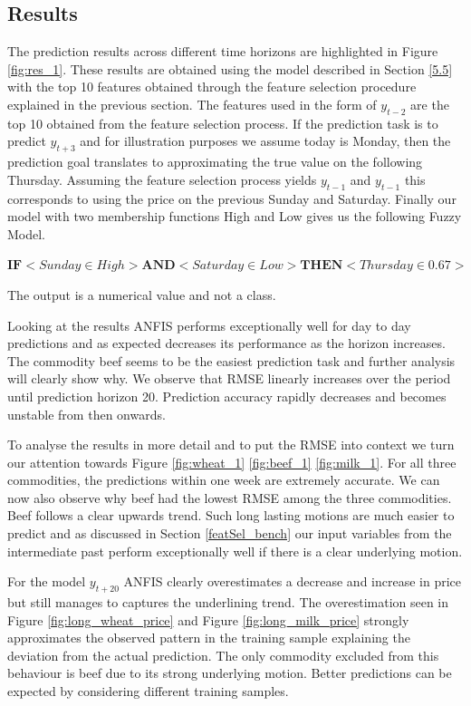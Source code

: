 \subsection{Results}

The prediction results across different time horizons are highlighted in Figure \ref{fig:res_1}. These results are obtained using the model described in Section \ref{5.5} with the top 10 features obtained through the feature selection procedure explained in the previous section. The features used in the form of $y_{t-2}$ are the top 10 obtained from the feature selection process. If the prediction task is to predict $y_{t+3}$ and for illustration purposes we assume today is Monday, then the prediction goal translates to approximating the true value on the following Thursday. Assuming the feature selection process yields $y_{t-1}$  and $y_{t-1}$ this corresponds to using the price on the previous Sunday and Saturday. Finally our model with two membership functions High and Low gives us the following Fuzzy Model. \\


\centerline {$ \textbf{IF} <  Sunday \in High> \textbf{AND} < Saturday \in Low > \textbf{THEN} <  Thursday \in 0.67 > $} 

The output is a numerical value and not a class. 

 Looking at the results ANFIS performs exceptionally well for day to day predictions and as expected decreases its performance as the horizon increases. The commodity beef seems to be the easiest prediction task and further analysis will clearly show why.   We observe that RMSE linearly increases over the period until prediction horizon 20. Prediction accuracy rapidly decreases and becomes unstable from then onwards.  

To analyse the results in more detail and to put the RMSE into context  we turn our attention towards Figure \ref{fig:wheat_1} \ref{fig:beef_1} \ref{fig:milk_1}. For all three commodities, the predictions within one week are extremely accurate. We can now also observe why beef had the lowest RMSE among the three commodities. Beef follows a clear upwards trend. Such long lasting motions are much easier to predict and as discussed in Section \ref{featSel_bench} our input variables from the intermediate past perform exceptionally well if there is a clear underlying motion. 

 For the model $y_{t+20}$  ANFIS clearly overestimates a decrease and increase in price but still manages to captures the underlining trend. The overestimation seen in Figure \ref{fig:long_wheat_price} and Figure \ref{fig:long_milk_price} strongly approximates the observed pattern in the training sample explaining the deviation from the actual prediction. The only commodity excluded from this behaviour is beef due to its strong underlying motion. Better predictions can be expected by considering different training samples. 






